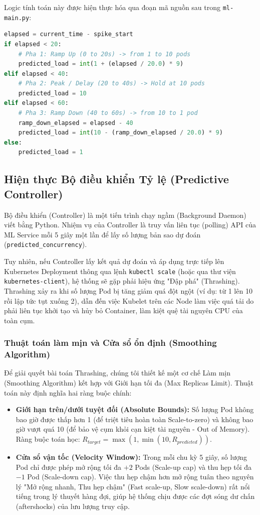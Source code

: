 \noindent\begin{minipage}{\textwidth}
Logic tính toán này được hiện thực hóa qua đoạn mã nguồn sau trong \texttt{ml-main.py}:
\begin{lstlisting}[language=Python, caption=Thuật toán giả lập 3 pha của ML Service]
elapsed = current_time - spike_start
if elapsed < 20:
    # Pha 1: Ramp Up (0 to 20s) -> from 1 to 10 pods
    predicted_load = int(1 + (elapsed / 20.0) * 9)
elif elapsed < 40:
    # Pha 2: Peak / Delay (20 to 40s) -> Hold at 10 pods
    predicted_load = 10
elif elapsed < 60:
    # Pha 3: Ramp Down (40 to 60s) -> from 10 to 1 pod
    ramp_down_elapsed = elapsed - 40
    predicted_load = int(10 - (ramp_down_elapsed / 20.0) * 9)
else:
    predicted_load = 1
\end{lstlisting}
\end{minipage}

\subsection{Hiện thực Bộ điều khiển Tỷ lệ (Predictive Controller)}
Bộ điều khiển (Controller) là một tiến trình chạy ngầm (Background Daemon) viết bằng Python. Nhiệm vụ của Controller là truy vấn liên tục (polling) API của ML Service mỗi 5 giây một lần để lấy số lượng bản sao dự đoán (\texttt{predicted\_concurrency}).

Tuy nhiên, nếu Controller lấy kết quả dự đoán và áp dụng trực tiếp lên Kubernetes Deployment thông qua lệnh \texttt{kubectl scale} (hoặc qua thư viện \texttt{kubernetes-client}), hệ thống sẽ gặp phải hiệu ứng "Đập phá" (Thrashing). Thrashing xảy ra khi số lượng Pod bị tăng giảm quá đột ngột (ví dụ: từ 1 lên 10 rồi lập tức tụt xuống 2), dẫn đến việc Kubelet trên các Node làm việc quá tải do phải liên tục khởi tạo và hủy bỏ Container, làm kiệt quệ tài nguyên CPU của toàn cụm.

\subsubsection{Thuật toán làm mịn và Cửa sổ ổn định (Smoothing Algorithm)}
Để giải quyết bài toán Thrashing, chúng tôi thiết kế một cơ chế Làm mịn (Smoothing Algorithm) kết hợp với Giới hạn tối đa (Max Replicas Limit). Thuật toán này định nghĩa hai ràng buộc chính:
\begin{itemize}
    \item \textbf{Giới hạn trên/dưới tuyệt đối (Absolute Bounds):} Số lượng Pod không bao giờ được thấp hơn 1 (để triệt tiêu hoàn toàn Scale-to-zero) và không bao giờ vượt quá 10 (để bảo vệ cụm khỏi cạn kiệt tài nguyên - Out of Memory). Ràng buộc toán học: $R_{target} = \max(1, \min(10, R_{predicted}))$.
    \item \textbf{Cửa sổ vận tốc (Velocity Window):} Trong mỗi chu kỳ 5 giây, số lượng Pod chỉ được phép mở rộng tối đa $+2$ Pods (Scale-up cap) và thu hẹp tối đa $-1$ Pod (Scale-down cap). Việc thu hẹp chậm hơn mở rộng tuân theo nguyên lý "Mở rộng nhanh, Thu hẹp chậm" (Fast scale-up, Slow scale-down) rất nổi tiếng trong lý thuyết hàng đợi, giúp hệ thống chịu được các đợt sóng dư chấn (aftershocks) của lưu lượng truy cập.
\end{itemize}

